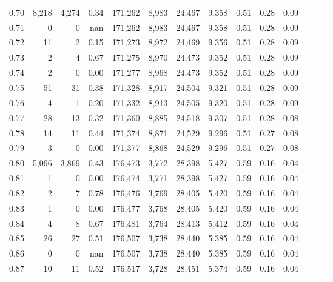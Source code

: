 \begin{tabular}{rrrrrrrrrrrrrr}
0.70 &   8,218 &  4,274 &  0.34 &  171,262 &    8,983 &  24,467 &   9,358 &  0.51 &  0.28 &      0.09 \\
0.71 &       0 &      0 &   nan &  171,262 &    8,983 &  24,467 &   9,358 &  0.51 &  0.28 &      0.09 \\
0.72 &      11 &      2 &  0.15 &  171,273 &    8,972 &  24,469 &   9,356 &  0.51 &  0.28 &      0.09 \\
0.73 &       2 &      4 &  0.67 &  171,275 &    8,970 &  24,473 &   9,352 &  0.51 &  0.28 &      0.09 \\
0.74 &       2 &      0 &  0.00 &  171,277 &    8,968 &  24,473 &   9,352 &  0.51 &  0.28 &      0.09 \\
0.75 &      51 &     31 &  0.38 &  171,328 &    8,917 &  24,504 &   9,321 &  0.51 &  0.28 &      0.09 \\
0.76 &       4 &      1 &  0.20 &  171,332 &    8,913 &  24,505 &   9,320 &  0.51 &  0.28 &      0.09 \\
0.77 &      28 &     13 &  0.32 &  171,360 &    8,885 &  24,518 &   9,307 &  0.51 &  0.28 &      0.08 \\
0.78 &      14 &     11 &  0.44 &  171,374 &    8,871 &  24,529 &   9,296 &  0.51 &  0.27 &      0.08 \\
0.79 &       3 &      0 &  0.00 &  171,377 &    8,868 &  24,529 &   9,296 &  0.51 &  0.27 &      0.08 \\
0.80 &   5,096 &  3,869 &  0.43 &  176,473 &    3,772 &  28,398 &   5,427 &  0.59 &  0.16 &      0.04 \\
0.81 &       1 &      0 &  0.00 &  176,474 &    3,771 &  28,398 &   5,427 &  0.59 &  0.16 &      0.04 \\
0.82 &       2 &      7 &  0.78 &  176,476 &    3,769 &  28,405 &   5,420 &  0.59 &  0.16 &      0.04 \\
0.83 &       1 &      0 &  0.00 &  176,477 &    3,768 &  28,405 &   5,420 &  0.59 &  0.16 &      0.04 \\
0.84 &       4 &      8 &  0.67 &  176,481 &    3,764 &  28,413 &   5,412 &  0.59 &  0.16 &      0.04 \\
0.85 &      26 &     27 &  0.51 &  176,507 &    3,738 &  28,440 &   5,385 &  0.59 &  0.16 &      0.04 \\
0.86 &       0 &      0 &   nan &  176,507 &    3,738 &  28,440 &   5,385 &  0.59 &  0.16 &      0.04 \\
0.87 &      10 &     11 &  0.52 &  176,517 &    3,728 &  28,451 &   5,374 &  0.59 &  0.16 &      0.04 \\

\end{tabular}
